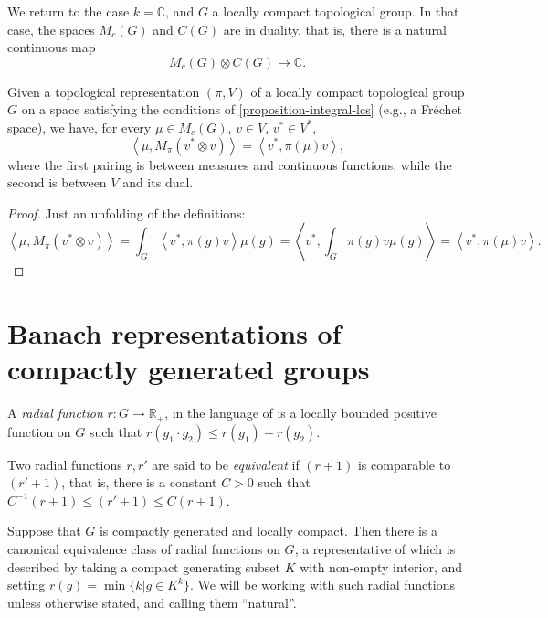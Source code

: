 We return to the case $k=\mathbb C$, and $G$ a locally compact topological group. In that case, the spaces $M_c(G)$ and $C(G)$ are in duality, that is, there is a natural continuous map
$$ M_c(G) \otimes C(G) \to \mathbb C.$$

\begin{lemma}
 \label{lemma-mc-dualto-operator}
Given a topological representation $(\pi, V)$ of  a locally compact topological group $G$ on a space satisfying the conditions of \ref{proposition-integral-lcs} (e.g., a Fr\'echet space), we have, for every $\mu\in M_c(G)$, $v\in V$, $v^*\in V^*$,
\begin{equation}
 \label{equation-mc-dualto-operator}
\left< \mu , M_\pi (v^*\otimes v)\right> = \left< v^*, \pi(\mu) v \right>,
\end{equation}
where the first pairing is between measures and continuous functions, while the second is between $V$ and its dual.
\end{lemma}

\begin{proof}
 Just an unfolding of the definitions:
$$\left< \mu , M_\pi (v^*\otimes v)\right> =  \int_G \left< v^*, \pi(g) v\right>  \mu(g) = \left< v^*, \int_G \pi(g) v \mu(g) \right> = \left< v^* , \pi(\mu) v\right>.$$
\end{proof}







 
 
\section{Banach representations of compactly generated groups}
\label{section-Banach-representations}

\begin{definition}
\label{definition-radial-function}
 A {\it radial function} $r: G\to \mathbb R_+$, in the language of 
 \cite{Bernstein-Plancherel}
is a locally bounded positive function on $G$ such that $r(g_1\cdot g_2) \le r(g_1) + r(g_2)$. 

Two radial functions $r, r'$ are said to be {\it equivalent} if $(r+1)$ is comparable to $(r'+1)$, that is, there is a constant $C>0$ such that $C^{-1} (r+1)\le (r'+1) \le C (r+1)$.
\end{definition}

Suppose that $G$ is compactly generated and locally compact. Then there is a canonical equivalence class of radial functions on $G$, a representative of which is described by taking a compact generating subset $K$ with non-empty interior, and setting $r(g) = \min\{k| g\in K^k\}$. We will be working with such radial functions unless otherwise stated, and calling them ``natural''. 


